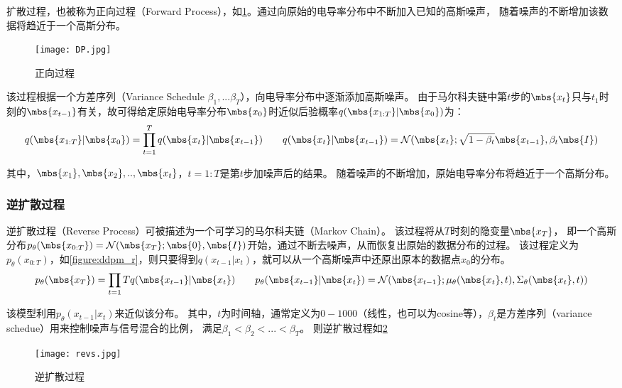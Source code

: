 扩散过程，也被称为正向过程（Forward Process），如\cref{figure:dp}。通过向原始的电导率分布中不断加入已知的高斯噪声，
随着噪声的不断增加该数据将趋近于一个高斯分布。

\begin{figure}[h]
    \centering
    \texttt{[image: DP.jpg]}
    \caption{正向过程}
    \label{figure:dp}
\end{figure}

该过程根据一个方差序列（Variance Schedule $\beta_1, ...\beta_T$），向电导率分布中逐渐添加高斯噪声。
由于马尔科夫链中第$t$步的$\mbs{x_t}$只与$t_1$时刻的$\mbs{x_{t-1}}$有关，故可得给定原始电导率分布$\mbs{x_0}$时近似后验概率$q(\mbs{x_{1:T}}|\mbs{x_0})$为：
\begin{equation}
    \centering
    q(\mbs{x_{1:T}}|\mbs{x_0}) = \prod_{t=1}^{T} q(\mbs{x_t}|\mbs{x_{t-1}}) \qquad
    q(\mbs{x_t}|\mbs{x_{t-1}}) = \mathcal{N}(\mbs{x_t}; \sqrt{1-\beta_t}\mbs{x_{t-1}}, \beta_t\mbs{I})
    \label{equation:ddpm_f}
  \end{equation}

其中，$\mbs{x_1}, \mbs{x_2},..,\mbs{x_t}$，$t=1:T$是第$t$步加噪声后的结果。
随着噪声的不断增加，原始电导率分布将趋近于一个高斯分布。


\subsubsection{逆扩散过程}

逆扩散过程（Reverse Process）可被描述为一个可学习的马尔科夫链（Markov Chain）。
该过程将从$T$时刻的隐变量$\mbs{x_T}$，
即一个高斯分布$p_\theta(\mbs{x_{0:T}}) = \mathcal{N}(\mbs{x_T}; \mbs{0},\mbs{I})$开始，通过不断去噪声，从而恢复出原始的数据分布的过程。
该过程定义为$p_\theta(x_{0:T})$，如\cref{figure:ddpm_r}，则只要得到$q(x_{t-1}|x_t)$，就可以从一个高斯噪声中还原出原本的数据点$x_0$的分布。
\begin{equation}
    \centering
    p_\theta(\mbs{x_{T}}) = \prod_{t=1}{T} q(\mbs{x_{t-1}}|\mbs{x_{t}}) \qquad
    p_\theta(\mbs{x_{t-1}}|\mbs{x_{t}}) = \mathcal{N}(\mbs{x_{t-1}}; \mu_\theta(\mbs{x_t}, t), \Sigma_\theta(\mbs{x_t}, t))
    \label{equation:ddpm_r}
\end{equation}


该模型利用$p_\theta(x_{t-1}|x_{t})$来近似该分布。
其中，$t$为时间轴，通常定义为$0-1000$（线性，也可以为cosine等），$\beta_t$是方差序列（variance schedue）用来控制噪声与信号混合的比例，
满足$\beta_1 < \beta_2 <...<\beta_T$。
则逆扩散过程如\cref{figure:revs}
\begin{figure}[h]
    \centering
    \texttt{[image: revs.jpg]}
    \caption{逆扩散过程}
    \label{figure:revs}
\end{figure}




